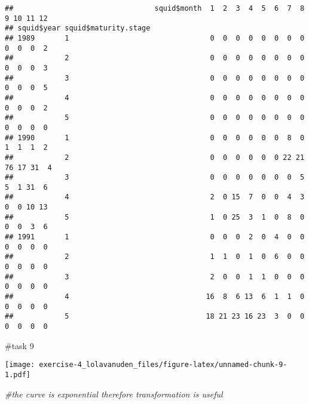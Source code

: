\documentclass[
]{article}
\newenvironment{Shaded}{\begin{snugshade}}{\end{snugshade}}
\newcommand{\AttributeTok}[1]{\textcolor[rgb]{0.13,0.29,0.53}{#1}}
\newcommand{\CommentTok}[1]{\textcolor[rgb]{0.56,0.35,0.01}{\textit{#1}}}
\newcommand{\DecValTok}[1]{\textcolor[rgb]{0.00,0.00,0.81}{#1}}
\newcommand{\FunctionTok}[1]{\textcolor[rgb]{0.13,0.29,0.53}{\textbf{#1}}}
\newcommand{\NormalTok}[1]{#1}
\newcommand{\OtherTok}[1]{\textcolor[rgb]{0.56,0.35,0.01}{#1}}
\newcommand{\SpecialCharTok}[1]{\textcolor[rgb]{0.81,0.36,0.00}{\textbf{#1}}}
\newcommand{\StringTok}[1]{\textcolor[rgb]{0.31,0.60,0.02}{#1}}
\begin{document}
\begin{verbatim}
##                                 squid$month  1  2  3  4  5  6  7  8  9 10 11 12
## squid$year squid$maturity.stage                                                
## 1989       1                                 0  0  0  0  0  0  0  0  0  0  0  2
##            2                                 0  0  0  0  0  0  0  0  0  0  0  3
##            3                                 0  0  0  0  0  0  0  0  0  0  0  5
##            4                                 0  0  0  0  0  0  0  0  0  0  0  2
##            5                                 0  0  0  0  0  0  0  0  0  0  0  0
## 1990       1                                 0  0  0  0  0  0  8  0  1  1  1  2
##            2                                 0  0  0  0  0  0 22 21 76 17 31  4
##            3                                 0  0  0  0  0  0  0  5  5  1 31  6
##            4                                 2  0 15  7  0  0  4  3  0  0 10 13
##            5                                 1  0 25  3  1  0  8  0  0  0  3  6
## 1991       1                                 0  0  0  2  0  4  0  0  0  0  0  0
##            2                                 1  1  0  1  0  6  0  0  0  0  0  0
##            3                                 2  0  0  1  1  0  0  0  0  0  0  0
##            4                                16  8  6 13  6  1  1  0  0  0  0  0
##            5                                18 21 23 16 23  3  0  0  0  0  0  0
\end{verbatim}

\#task 9

\begin{Shaded}
\end{Shaded}

\texttt{[image: exercise-4\_lolavanuden\_files/figure-latex/unnamed-chunk-9-1.pdf]}

\begin{Shaded}
\begin{Highlighting}[]
\CommentTok{\#the curve is exponential therefore transformation is useful}
\end{Highlighting}
\end{Shaded}
\end{document}
